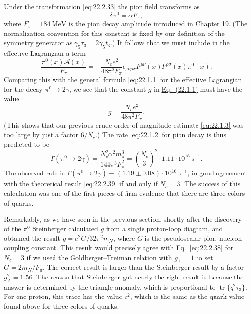 Under the transformation \eqref{eq:22.2.33} the pion field transforms as
\begin{equation}
 \delta\pi^0=\alpha F_\pi,
 \tag{22.2.36}\label{eq:22.2.36}
\end{equation}
where $F_\pi=184\ \mathrm{MeV}$ is the pion decay amplitude introduced in
\hyperref[sec:19.4]{Chapter 19}. (The normalization convention for this
constant is fixed by our definition of the symmetry generator as
$\gamma_5\tau_3=2\gamma_5t_3$.) It follows that we must include in the
effective Lagrangian a term
\begin{equation}
 \frac{\pi^0(x)\mathcal A(x)}{F_\pi}
 =-\frac{N_ce^2}{48\pi^2F_\pi}\epsilon_{\mu\nu\rho\sigma}
 F^{\mu\nu}(x)F^{\rho\sigma}(x)\pi^0(x).
 \tag{22.2.37}\label{eq:22.2.37}
\end{equation}
Comparing this with the general formula \eqref{eq:22.1.1} for the
effective Lagrangian for the decay $\pi^0\to2\gamma$, we see that the
constant $g$ in \hyperref[eq:22.1.1]{Eq.~(22.1.1)} must have the value
\begin{equation}
 g=\frac{N_ce^2}{48\pi^2F_\pi}.
 \tag{22.2.38}\label{eq:22.2.38}
\end{equation}
(This shows that our previous crude order-of-magnitude estimate
\eqref{eq:22.1.3} was too large by just a factor $6/N_c$.) The rate
\eqref{eq:22.1.2} for pion decay is thus predicted to be
\begin{equation}
 \Gamma(\pi^0\to2\gamma)
 =\frac{N_c^2\alpha^2m_\pi^3}{144\pi^3F_\pi^2}
 =\left(\frac{N_c}{3}\right)^2
 \cdot1.11\cdot10^{16}\ \mathrm{s}^{-1}.
 \tag{22.2.39}\label{eq:22.2.39}
\end{equation}
The observed rate is
$\Gamma(\pi^0\to2\gamma)=(1.19\mathbin{\pm}0.08)\cdot10^{16}\
\mathrm{s}^{-1}$, in good agreement with the theoretical result
\eqref{eq:22.2.39} if and only if $N_c=3$. The success of this calculation
was one of the first pieces of firm evidence that there are three colors of
quarks.

Remarkably, as we have seen in the previous section, shortly after the
discovery of the $\pi^0$ Steinberger calculated $g$ from a single
proton-loop diagram, and obtained the result
$g=e^2G/32\pi^2m_N$, where $G$ is the pseudoscalar pion--nucleon coupling
constant. This result would precisely agree with Eq.~\eqref{eq:22.2.38}
for $N_c=3$ if we used the Goldberger--Treiman relation with $g_A=1$ to
set $G=2m_N/F_\pi$. The correct result is larger than the Steinberger
result by a factor $g_A^2=1.56$. The reason that Steinberger got nearly the
right result is because the answer is determined by the triangle anomaly,
which is proportional to $\operatorname{tr}\{q^2\tau_3\}$. For one proton,
this trace has the value $e^2$, which is the same as the quark value found
above for three colors of quarks.

